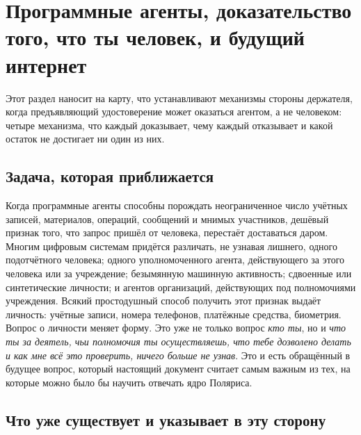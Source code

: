 \section{Программные агенты, доказательство того, что ты человек, и будущий интернет}
\label{sec:agents}



Этот раздел наносит на карту, что устанавливают механизмы стороны держателя, когда предъявляющий
удостоверение может оказаться агентом, а не человеком: четыре механизма, что каждый доказывает, чему
каждый отказывает и какой остаток не достигает ни один из них.

\subsection{Задача, которая приближается}

Когда программные агенты способны порождать неограниченное число учётных записей, материалов,
операций, сообщений и мнимых участников, дешёвый признак того, что запрос пришёл от человека,
перестаёт доставаться даром. Многим цифровым системам придётся различать, не узнавая лишнего,
одного подотчётного человека; одного уполномоченного агента, действующего за этого человека или
за учреждение; безымянную машинную активность; сдвоенные или синтетические личности; и агентов
организаций, действующих под полномочиями учреждения. Всякий простодушный способ получить этот
признак выдаёт личность: учётные записи, номера телефонов, платёжные средства, биометрия. Вопрос о
личности меняет форму. Это уже не только вопрос \emph{кто ты}, но и \emph{что ты за деятель, чьи
полномочия ты осуществляешь, что тебе дозволено делать и как мне всё это проверить, ничего больше
не узнав}. Это и есть обращённый в будущее вопрос, который настоящий документ считает самым
важным из тех, на которые можно было бы научить отвечать ядро Поляриса.

\subsection{Что уже существует и указывает в эту сторону}

